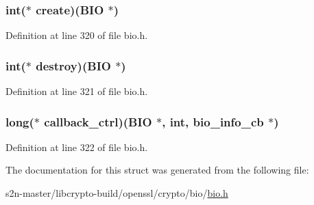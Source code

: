 \subsubsection[{\texorpdfstring{create}{create}}]{\setlength{\rightskip}{0pt plus 5cm}int($\ast$ create)({\bf B\+IO} $\ast$)}\hypertarget{structbio__method__st_ac775170e5332802bf577c00e8e7bb003}{}\label{structbio__method__st_ac775170e5332802bf577c00e8e7bb003}


Definition at line 320 of file bio.\+h.

\subsubsection[{\texorpdfstring{destroy}{destroy}}]{\setlength{\rightskip}{0pt plus 5cm}int($\ast$ destroy)({\bf B\+IO} $\ast$)}\hypertarget{structbio__method__st_afa34caa5033a0c66a5e9baf4eaf7e69d}{}\label{structbio__method__st_afa34caa5033a0c66a5e9baf4eaf7e69d}


Definition at line 321 of file bio.\+h.

\subsubsection[{\texorpdfstring{callback\+\_\+ctrl}{callback_ctrl}}]{\setlength{\rightskip}{0pt plus 5cm}long($\ast$ callback\+\_\+ctrl)({\bf B\+IO} $\ast$, int, {\bf bio\+\_\+info\+\_\+cb} $\ast$)}\hypertarget{structbio__method__st_abcdb621b50de7d3aac8b52cc87652f7a}{}\label{structbio__method__st_abcdb621b50de7d3aac8b52cc87652f7a}


Definition at line 322 of file bio.\+h.



The documentation for this struct was generated from the following file\+:\begin{DoxyCompactItemize}
\item 
s2n-\/master/libcrypto-\/build/openssl/crypto/bio/\hyperlink{crypto_2bio_2bio_8h}{bio.\+h}\end{DoxyCompactItemize}
